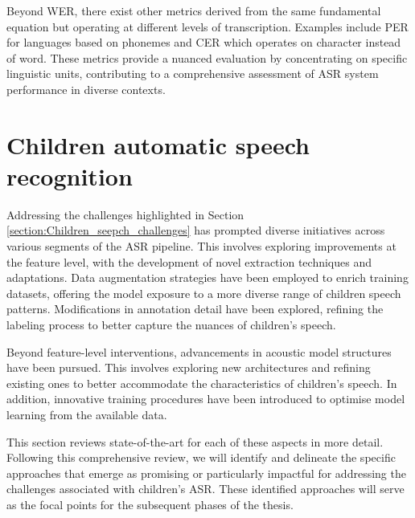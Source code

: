 Beyond \ac{WER}, there exist other metrics derived from the same fundamental equation but operating at different levels of transcription. Examples include \ac{PER} for languages based on phonemes and \ac{CER} which operates on character instead of word. These metrics provide a nuanced evaluation by concentrating on specific linguistic units, contributing to a comprehensive assessment of \ac{ASR} system performance in diverse contexts.

\newpage
\section{Children automatic speech recognition} %
Addressing the challenges highlighted in Section \ref{section:Children_seepch_challenges} has prompted diverse initiatives across various segments of the \ac{ASR} pipeline. This involves exploring improvements at the feature level, with the development of novel extraction techniques and adaptations. Data augmentation strategies have been employed to enrich training datasets, offering the model exposure to a more diverse range of children speech patterns.  Modifications in annotation detail have been explored, refining the labeling process to better capture the nuances of children's speech.

Beyond feature-level interventions, advancements in acoustic model structures have been pursued. This involves exploring new architectures and refining existing ones to better accommodate the characteristics of children's speech. In addition, innovative training procedures have been introduced to optimise model learning from the available data.

This section reviews state-of-the-art for each of these aspects in more detail. Following this comprehensive review, we will identify and delineate the specific approaches that emerge as promising or particularly impactful for addressing the challenges associated with children's  \ac{ASR}. These identified approaches will serve as the focal points for the subsequent phases of the thesis.
 
